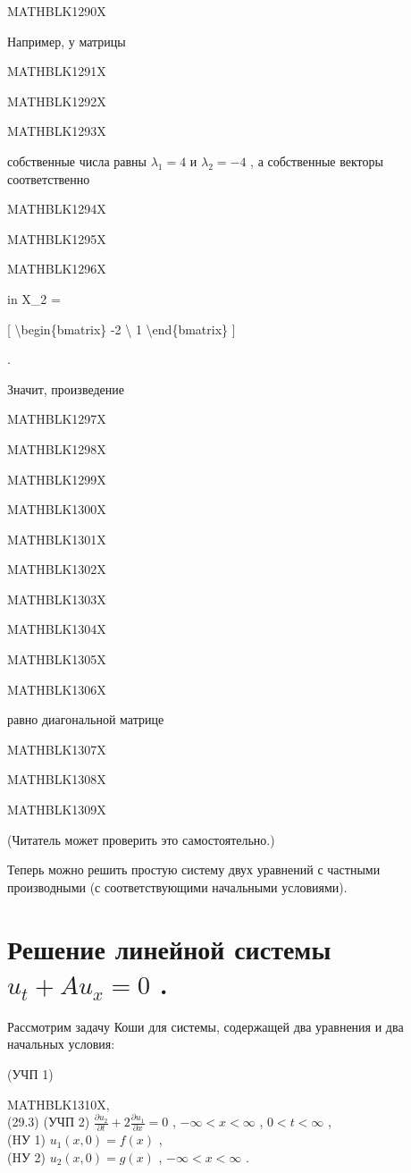\documentclass[
]{article}
\begin{document}
MATHBLK1290X

Например, у матрицы

MATHBLK1291X

MATHBLK1292X

MATHBLK1293X

собственные числа равны \(\lambda_ 1 = 4\) и \(\lambda_2 = -4\) , а
собственные векторы соответственно

MATHBLK1294X

MATHBLK1295X

MATHBLK1296X

in X\_2 =

{[} \textbackslash begin\{bmatrix\} -2 \textbackslash{} 1
\textbackslash end\{bmatrix\} {]}

.

Значит, произведение

MATHBLK1297X

MATHBLK1298X

MATHBLK1299X

MATHBLK1300X

MATHBLK1301X

MATHBLK1302X

MATHBLK1303X

MATHBLK1304X

MATHBLK1305X

MATHBLK1306X

равно диагональной матрице

MATHBLK1307X

MATHBLK1308X

MATHBLK1309X

(Читатель может проверить это самостоятельно.)

Теперь можно решить простую систему двух уравнений с частными
производными (с соответствующими начальными условиями).

\section{\texorpdfstring{Решение линейной системы \(u_t + Au_x = 0\)
.}{Решение линейной системы u\_t + Au\_x = 0 .}}\label{ux440ux435ux448ux435ux43dux438ux435-ux43bux438ux43dux435ux439ux43dux43eux439-ux441ux438ux441ux442ux435ux43cux44b-u_t-au_x-0-.}

Рассмотрим задачу Коши для системы, содержащей два уравнения и два
начальных условия:

(УЧП 1)

MATHBLK1310X,\\
(29.3) (УЧП 2)
\(\frac{\partial u_2}{\partial t} + 2 \frac{\partial u_1}{\partial x} = 0\)
, \(-\infty < x < \infty\) , \(0 < t < \infty\) ,\\
(HУ 1) \(u_1(x, 0) = f(x)\) ,\\
(HУ 2) \(u_2(x, 0) = g(x)\) , \(-\infty < x < \infty\) .
\end{document}
